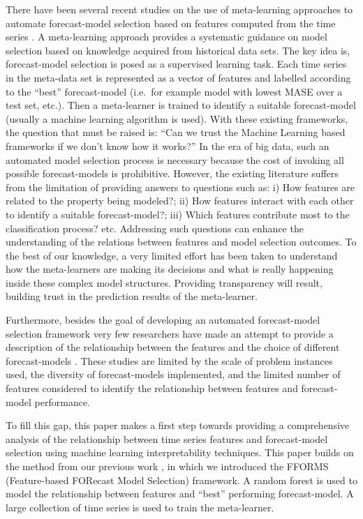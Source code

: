 \documentclass[11pt,a4paper,]{article}
\begin{document}
There have been several recent studies on the use of meta-learning approaches to automate forecast-model selection based on features computed from the time series \autocites{shah1997model}{prudencio2004meta}{lemke2010meta}{kuck2016meta}. A meta-learning approach provides a systematic guidance on model selection based on knowledge acquired from historical data sets. The key idea is, forecast-model selection is posed as a supervised learning task. Each time series in the meta-data set is represented as a vector of features and labelled according to the ``best'' forecast-model (i.e.~for example model with lowest MASE over a test set, etc.). Then a meta-learner is trained to identify a suitable forecast-model (usually a machine learning algorithm is used). With these existing frameworks, the question that must be raised is: ``Can we trust the Machine Learning based frameworks if we don't know how it works?'' In the era of big data, such an automated model selection process is necessary because the cost of invoking all possible forecast-models is prohibitive. However, the existing literature suffers from the limitation of providing answers to questions such as: i) How features are related to the property being modeled?; ii) How features interact with each other to identify a suitable forecast-model?; iii) Which features contribute most to the classification process? etc. Addressing such questions can enhance the understanding of the relations between features and model selection outcomes. To the best of our knowledge, a very limited effort has been taken to understand how the meta-learners are making its decisions and what is really happening inside these complex model structures. Providing transparency will result, building trust in the prediction results of the meta-learner.

Furthermore, besides the goal of developing an automated forecast-model selection framework very few researchers have made an attempt to provide a description of the relationship between the features and the choice of different forecast-models \autocites{schnaars1984situational}{wang2009rule}{lemke2010meta}[ are among some exceptions]{petropoulos2014horses}. These studies are limited by the scale of problem instances used, the diversity of forecast-models implemented, and the limited number of features considered to identify the relationship between features and forecast-model performance.

To fill this gap, this paper makes a first step towards providing a comprehensive analysis of the relationship between time series features and forecast-model selection using machine learning interpretability techniques. This paper builds on the method from our previous work \textcite{fforms}, in which we introduced the FFORMS (Feature-based FORecast Model Selection) framework. A random forest is used to model the relationship between features and ``best'' performing forecast-model. A large collection of time series is used to train the meta-learner.
\end{document}
